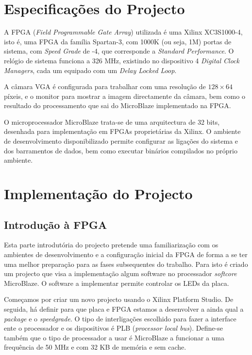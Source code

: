 \documentclass[a4paper]{article}
\begin{document}
\section{Especificações do Projecto}

A FPGA (\textit{Field Programmable Gate Array}) utilizada é uma Xilinx XC3S1000-4, isto é, uma FPGA da família Spartan-3, com 1000K (ou seja, 1M) portas de sistema, com \textit{Speed Grade} de -4, que corresponde a \textit{Standard Performance}. O relógio de sistema funciona a 326 MHz, existindo no dispositivo 4 \textit{Digital Clock Managers}, cada um equipado com um \textit{Delay Locked Loop}\cite{bib:s3datasheet}.

A câmara VGA é configurada para trabalhar com uma resolução de $128\times64$ píxeis, e o monitor para mostrar a imagem directamente da câmara, bem como o resultado do processamento que sai do MicroBlaze implementado na FPGA.

O microprocessador MicroBlaze trata-se de uma arquitectura de 32 bits, desenhada para implementação em FPGAs proprietárias da Xilinx\textregistered\cite{bib:microblaze}. O ambiente de desenvolvimento disponibilizado permite configurar as ligações do sistema e dos barramentos de dados, bem como executar binários compilados no próprio ambiente.

\section{Implementação do Projecto}
\subsection{Introdução à FPGA}
\label{subsec:LEDs}

Esta parte introdutória do projecto pretende uma familiarização com os ambientes de desenvolvimento e a configuração inicial da FPGA de forma a se ter uma melhor preparação para as fases subsequentes do trabalho. Para isto é criado um projecto que visa a implementação algum software no processador \textit{softcore} MicroBlaze. O software a implementar permite controlar os LEDs da placa.

Começamos por criar um novo projecto usando o Xilinx Platform Studio. De seguida, há definir para que placa e FPGA estamos a desenvolver a ainda qual a \textit{package} e o \textit{speedgrade}. O tipo de interligações escolhido para fazer a interface ente o processador e os dispositivos é PLB (\textit{processor local bus}). Define-se também que o tipo de processador a usar é MicroBlaze a funcionar a uma frequência de 50 MHz e com 32 KB de memória e sem cache.
\end{document}
